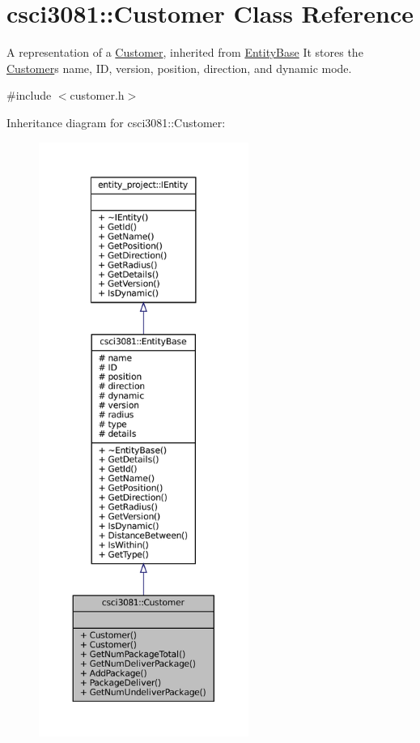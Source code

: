 \hypertarget{classcsci3081_1_1Customer}{}\section{csci3081\+:\+:Customer Class Reference}
\label{classcsci3081_1_1Customer}


A representation of a \hyperlink{classcsci3081_1_1Customer}{Customer}, inherited from \hyperlink{classcsci3081_1_1EntityBase}{Entity\+Base} It stores the \hyperlink{classcsci3081_1_1Customer}{Customer}\textquotesingle{}s name, ID, version, position, direction, and dynamic mode.  




{\ttfamily \#include $<$customer.\+h$>$}



Inheritance diagram for csci3081\+:\+:Customer\+:
\nopagebreak
\begin{figure}[H]
\begin{center}
\leavevmode
\includegraphics[height=550pt]{classcsci3081_1_1Customer__inherit__graph}
\end{center}
\end{figure}
